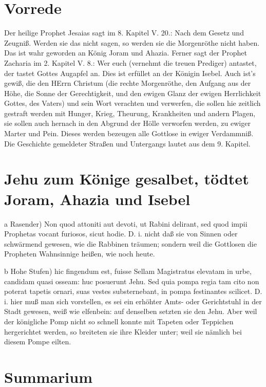 \section{Vorrede}

Der heilige Prophet Jesaias sagt im 8. Kapitel V. 20.: Nach dem Gesetz und Zeugniß. Werden sie das nicht sagen, so werden sie die Morgenröthe nicht haben. Das ist wahr geworden an König Joram und Ahazia. Ferner sagt der Prophet Zacharia im 2. Kapitel V. 8.: Wer euch (vernehmt die treuen Prediger)
antastet, der tastet Gottes Augapfel an. Dies ist erfüllet an der Königin Isebel. Auch ist's gewiß, die den HErrn Christum (die rechte Morgenröthe, den Aufgang aus der Höhe, die Sonne der Gerechtigkeit, und den ewigen Glanz der ewigen Herrlichkeit Gottes, des Vaters) und sein Wort verachten und verwerfen, die sollen hie zeitlich gestraft werden mit Hunger, Krieg, Theurung, Krankheiten und andern Plagen, sie sollen auch hernach in den Abgrund der Hölle verworfen werden, zu ewiger Marter und Pein. Dieses werden bezeugen alle Gottlose in ewiger Verdammniß. Die Geschichte gemeldeter Straßen und Untergangs lautet aus dem 9. Kapitel.

\section[Jehu zum Könige gesalbet, tödtet Joram, Ahazia und]{Jehu zum Könige gesalbet, tödtet Joram, Ahazia und Isebel}

a Rasender) Non quod attoniti aut devoti, ut Rabini delirant, sed quod impii Prophetas vocant furiosos, sicut hodie. D. i. nicht daß sie von Sinnen oder schwärmend gewesen, wie die Rabbinen träumen; sondern weil die Gottlosen die Propheten Wahnsinnige heißen, wie noch heute.

b Hohe Stufen) hic fingendum est, fuisse Sellam Magistratus elevatam in urbe, candidam quasi osseam: huc posuerunt Jehu. Sed quia pompa regia tam cito non poterat tapetis ornari, suas vestes substernebant, in pompa festinantes scilicet. D. i. hier muß man sich vorstellen, es sei ein erhöhter Amts- oder Gerichtstuhl in der Stadt gewesen, weiß wie elfenbein: auf denselben setzten sie den Jehu. Aber weil der königliche Pomp nicht so schnell konnte mit Tapeten oder Teppichen hergerichtet werden, so breiteten sie ihre Kleider unter; weil sie nämlich bei diesem Pompe eilten.

\section{Summarium}

